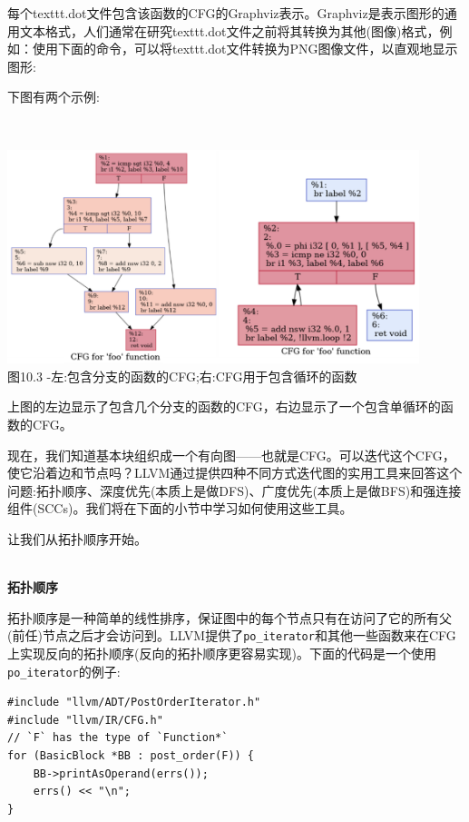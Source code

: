 每个texttt{.dot}文件包含该函数的CFG的Graphviz表示。Graphviz是表示图形的通用文本格式，人们通常在研究texttt{.dot}文件之前将其转换为其他(图像)格式，例如：使用下面的命令，可以将texttt{.dot}文件转换为PNG图像文件，以直观地显示图形:


下图有两个示例:

\hspace*{\fill} \\ %
\begin{center}
\includegraphics[width=0.9\textwidth]{content/3/chapter10/images/3.png}\\
图10.3 -左:包含分支的函数的CFG;右:CFG用于包含循环的函数
\end{center}

上图的左边显示了包含几个分支的函数的CFG，右边显示了一个包含单循环的函数的CFG。

现在，我们知道基本块组织成一个有向图——也就是CFG。可以迭代这个CFG，使它沿着边和节点吗？LLVM通过提供四种不同方式迭代图的实用工具来回答这个问题:拓扑顺序、深度优先(本质上是做DFS)、广度优先(本质上是做BFS)和强连接组件(SCCs)。我们将在下面的小节中学习如何使用这些工具。

让我们从拓扑顺序开始。

\hspace*{\fill} \\ %
\noindent
\textbf{拓扑顺序}

拓扑顺序是一种简单的线性排序，保证图中的每个节点只有在访问了它的所有父(前任)节点之后才会访问到。LLVM提供了\texttt{po\_iterator}和其他一些函数来在CFG上实现反向的拓扑顺序(反向的拓扑顺序更容易实现)。下面的代码是一个使用\texttt{po\_iterator}的例子:

\begin{lstlisting}[style=styleCXX]
#include "llvm/ADT/PostOrderIterator.h"
#include "llvm/IR/CFG.h"
// `F` has the type of `Function*`
for (BasicBlock *BB : post_order(F)) {
	BB->printAsOperand(errs());
	errs() << "\n";
}
\end{lstlisting}

